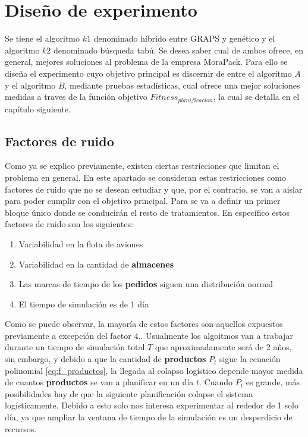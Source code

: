 \chapter{Diseño de experimento} \label{ch: general}


Se tiene el algoritmo $k1$ denominado híbrido entre GRAPS y genético y el algoritmo $k2$ denominado búsqueda tabú. Se desea saber cual de ambos ofrece, en general, mejores soluciones al problema de la empresa MoraPack. Para ello se diseña el experimento cuyo objetivo principal es discernir de entre el algoritmo $A$ y el algoritmo $B$, mediante pruebas estadísticas, cual ofrece una mejor soluciones medidas a traves de la función objetivo $Fitness_{planificacion}$, la cual se detalla en el capítulo siguiente.


\section{Factores de ruido}
Como ya se explico previamente, existen ciertas restricciones que limitan el problema en general. En este apartado se consideran estas restricciones como factores de ruido que no se desean estudiar y que, por el contrario, se van a aislar para poder cumplir con el objetivo principal. Para se va a definir un primer bloque único donde se conducirán el resto de tratamientos. En específico estos factores de ruido son los siguientes:

\begin{enumerate}
    \item Variabilidad en la flota de aviones
    \item Variabilidad en la cantidad de \textbf{almacenes}
    \item Las marcas de tiempo de los \textbf{pedidos} siguen una distribución normal
    \item El tiempo de simulación es de 1 día
\end{enumerate}

Como se puede observar, la mayoría de estos factores son aquellos expuestos previamente a excepción del factor $4.$. Usualmente los algoitmos van a trabajar durante un tiempo de simulación total $T$ que aproximadamente será de 2 años, sin embargo, y debido a que la cantidad de \textbf{productos} $P_t$ sigue la ecuación polinomial \ref{eq:f_productos}, la llegada al colapso logístico depende mayor medida de cuantos \textbf{productos} se van a planificar en un día $t$. Cuando $P_t$ es grande, más posibilidades hay de que la siguiente planificación colapse el sistema logísticamente. Debido a esto solo nos interesa experimentar al rededor de 1 solo día, ya que ampliar la ventana de tiempo de la simulación es un desperdicio de recursos.

